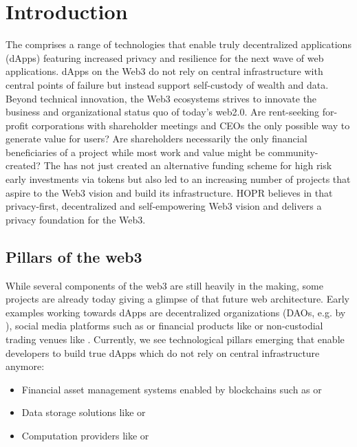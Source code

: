 \section{Introduction}

The  comprises a range of technologies that enable truly decentralized applications (dApps) featuring increased privacy and resilience for the next wave of web applications. dApps on the Web3 do not rely on central infrastructure with central points of failure but instead support self-custody of wealth and data. Beyond technical innovation, the Web3 ecosystems strives to innovate the business and organizational status quo of today's web2.0. Are rent-seeking for-profit corporations with shareholder meetings and CEOs the only possible way to generate value for users? Are shareholders necessarily the only financial beneficiaries of a project while most work and value might be community-created? The  has not just created an alternative funding scheme for high risk early investments via tokens but also led to an increasing number of projects that aspire to the Web3 vision and build its infrastructure. HOPR believes in that privacy-first, decentralized and self-empowering Web3 vision and delivers a privacy foundation for the Web3.

\subsection{Pillars of the web3}
While several components of the web3 are still heavily in the making, some projects are already today giving a glimpse of that future web architecture. Early examples working towards dApps are decentralized organizations (DAOs, e.g. by ), social media platforms such as  or financial products like  or non-custodial trading venues like . Currently, we see technological pillars emerging that enable developers to build true dApps which do not rely on central infrastructure anymore:
\begin{itemize}
    \item Financial asset management systems enabled by blockchains such as  or 
    \item Data storage solutions like  or 
    \item Computation providers like  or 
\end{itemize}

